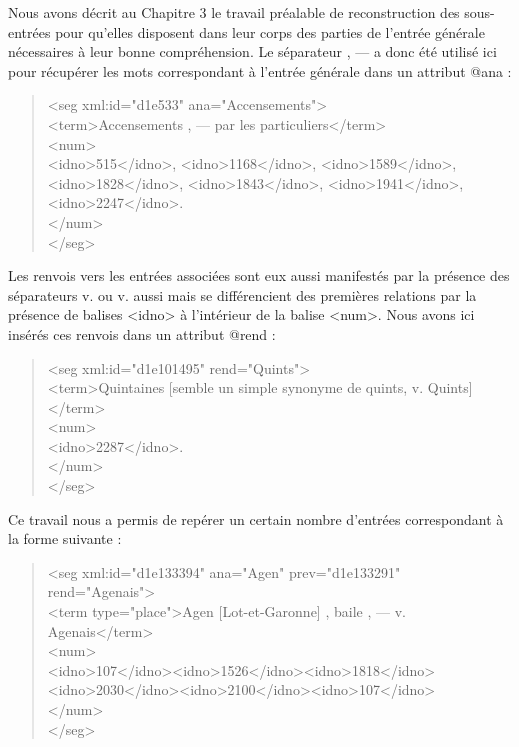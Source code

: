 \documentclass[a4paper,12pt,twoside]{book}
\begin{document}
	\noindent Nous avons décrit au Chapitre 3 le travail préalable de reconstruction des sous-entrées pour qu'elles disposent dans leur corps des parties de l'entrée générale nécessaires à leur bonne compréhension. Le séparateur \og{} , — \fg{} a donc été utilisé ici pour récupérer les mots correspondant à l'entrée générale dans un attribut @ana :
	
	\begin{quotation}
		<seg xml:id="d1e533" ana="Accensements">\\
		\indent{}Accensements , — par les particuliers</term>\\
		\indent\indent<num>\\
		\indent\indent{}515</idno>, <idno>1168</idno>, <idno>1589</idno>,\\ 
		\indent\indent{}1828</idno>,
		<idno>1843</idno>, <idno>1941</idno>, \\
		\indent\indent{}2247</idno>.\\
		\indent{}\\
	\end{quotation}
	
	\noindent Les renvois vers les entrées associées sont eux aussi manifestés par la présence des séparateurs \og v.\fg{} ou \og v. aussi\fg{} mais se différencient des premières relations par la présence de balises <idno> à l'intérieur de la balise <num>. Nous avons ici insérés ces renvois dans un attribut @rend :
	
	\begin{quotation}
			<seg xml:id="d1e101495" rend="Quints">\\
			\indent\indent<term>Quintaines [semble un simple synonyme de quints, v. Quints]</term>\\
			\indent\indent<num>\\
			\indent\indent\indent<idno>2287</idno>.\\
			\indent\indent</num>\\
			\indent</seg>\\
	\end{quotation}
	
	\noindent Ce travail nous a permis de repérer un certain nombre d'entrées correspondant à la forme suivante :
	
	\begin{quotation}
               <seg xml:id="d1e133394" ana="Agen" prev="d1e133291" rend="Agenais">\\
				\indent\indent<term type="place">Agen [Lot-et-Garonne] , baile , — v. Agenais</term>\\
				\indent{}\\
				\indent\indent\indent<idno>107</idno><idno>1526</idno><idno>1818</idno>\\
				\indent\indent\indent<idno>2030</idno><idno>2100</idno><idno>107</idno>\\
				\indent\indent</num>\\
				\indent</seg>
	\end{quotation}
\end{document}
